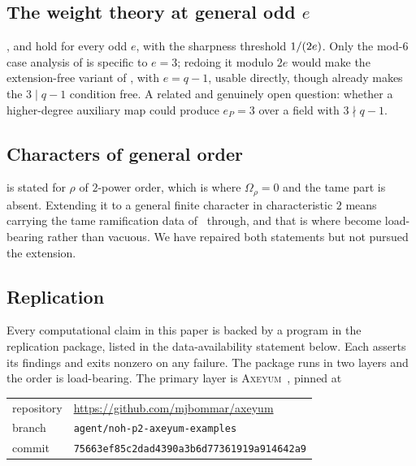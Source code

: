\subsection*{The weight theory at general odd \texorpdfstring{$e$}{e}}

,  and
 hold for every odd $e$, with the sharpness threshold
$1/(2e)$. Only the mod-$6$ case analysis of  is
specific to $e = 3$; redoing it modulo $2e$ would make the extension-free
variant of , with $e = q-1$, usable directly, though
 already makes the $3 \mid q-1$ condition free. A
related and genuinely open question: whether a higher-degree auxiliary map
could produce $e_P = 3$ over a field with $3 \nmid q-1$.

\subsection*{Characters of general order}

 is stated for $\rho$ of $2$-power order, which is where
$\Omega_\rho = 0$ and the tame part is absent. Extending it to a general
finite character in characteristic $2$ means carrying the tame ramification
data of~\cite[\S4.1]{kramermiller2020abelian} through, and that is where
 become load-bearing rather
than vacuous. We have repaired both statements but not pursued the
extension.

\subsection*{Replication}

Every computational claim in this paper is backed by a program in the
replication package, listed in the data-availability statement below. Each
asserts its findings and exits nonzero on any failure. The package runs in
two layers and the order is load-bearing. The primary layer is
\textsc{Axeyum}~\cite{axeyum2026}, pinned at

\begin{center}
\small
\begin{tabular}{@{}ll@{}}
  repository & \url{https://github.com/mjbommar/axeyum}\\
  branch     & \texttt{agent/noh-p2-axeyum-examples}\\
  commit     & \texttt{75663ef85c2dad4390a3b6d77361919a914642a9}
\end{tabular}
\end{center}

